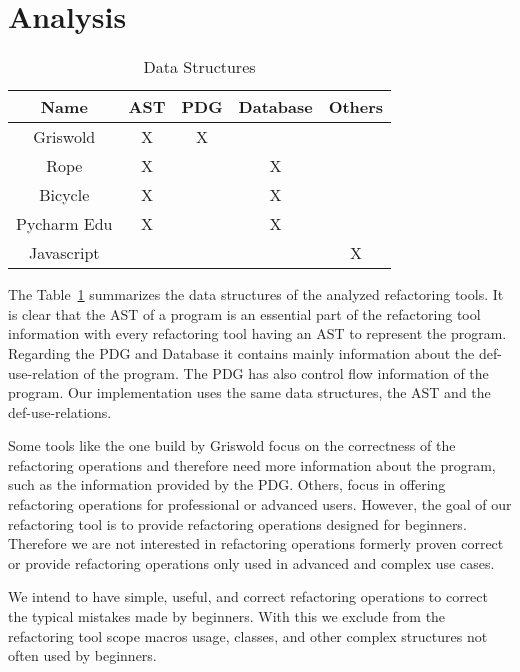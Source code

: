 \section{Analysis}
\begin{table}[]
\centering
\caption{Data Structures}
\label{tab:my-table}
\begin{tabular}{c|c|c|c|c}
Name       & AST & PDG & Database & Others \\ \hline
Griswold   & X   & X   &          &        \\ \hline
Rope       & X   &     & X        &        \\ \hline
Bicycle    & X   &     & X        &        \\ \hline
Pycharm Edu & X   &     & X        &        \\ \hline
Javascript &     &     &          & X
\end{tabular}
\end{table}

The Table~\ref{tab:my-table} summarizes the data structures of the analyzed refactoring tools.
It is clear that the AST of a program is an essential part of the refactoring
tool information with every refactoring tool having an AST to represent the program.
Regarding the PDG and Database it contains mainly information about the def-use-relation
of the program. The PDG has also control flow information of the program.
Our implementation uses the same data structures, the AST and
the def-use-relations.



Some tools like the one build by Griswold focus on the correctness of the refactoring
operations and therefore need more information about the program, such as the information
provided by the PDG.
Others, focus in offering refactoring operations for professional or advanced users.
However, the goal of our refactoring tool is to provide refactoring operations
designed for beginners.
Therefore we are not interested in refactoring operations formerly proven
correct or provide refactoring operations only used in advanced and complex use cases.

We intend to have simple, useful, and correct refactoring operations to correct the typical mistakes made by beginners.
With this we exclude from the refactoring tool scope  macros usage, classes, and other complex structures
not often used by beginners.

